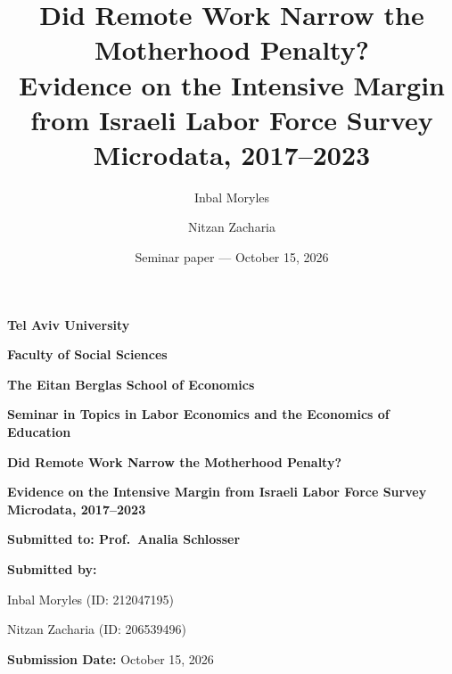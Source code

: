 \documentclass[12pt,a4paper]{article}
\title{Did Remote Work Narrow the Motherhood Penalty?\\
\large Evidence on the Intensive Margin from Israeli Labor Force Survey Microdata, 2017--2023}
\author{Inbal Moryles \and Nitzan Zacharia}
\date{Seminar paper --- October 15, 2026}
\begin{document}
\hypersetup{pageanchor=false}
\begin{titlepage}
    \centering

    {\large \textbf{Tel Aviv University}\par}
    \vspace{0.3cm}
    {\large \textbf{Faculty of Social Sciences}\par}
    \vspace{0.3cm}
    {\large \textbf{The Eitan Berglas School of Economics}\par}

    \vspace{1.5cm}

    {\large \textbf{Seminar in Topics in Labor Economics and the Economics of Education}\par}

    \vspace{3cm}

    {\LARGE \textbf{Did Remote Work Narrow the Motherhood Penalty?}\par}
    \vspace{0.5cm}
    {\large \textbf{Evidence on the Intensive Margin from Israeli Labor Force Survey
    Microdata, 2017--2023}\par}

    \vspace{3cm}

    {\large \textbf{Submitted to: Prof.\ Analia Schlosser}\par}

    \vspace{2cm}

    {\large \textbf{Submitted by:}\par}
    \vspace{0.5cm}
    {\large Inbal Moryles \quad (ID: 212047195)\par}
    \vspace{0.2cm}
    {\large Nitzan Zacharia \quad (ID: 206539496)\par}

    \vfill

    {\large \textbf{Submission Date:} October 15, 2026\par}

\end{titlepage}
\hypersetup{pageanchor=true}
\end{document}
